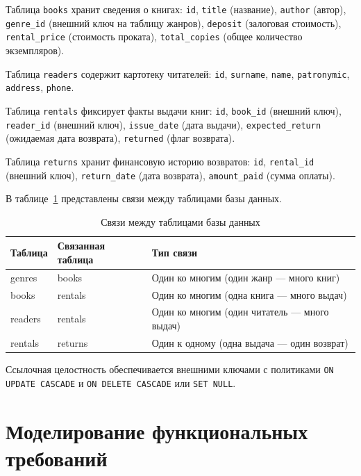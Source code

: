 \documentclass[14pt]{extreport}
\begin{document}
	Таблица \texttt{books} хранит сведения о книгах: \texttt{id}, \texttt{title} (название), \texttt{author} (автор), \texttt{genre\_id} (внешний ключ на таблицу жанров), \texttt{deposit} (залоговая стоимость), \texttt{rental\_price} (стоимость проката), \texttt{total\_copies} (общее количество экземпляров).
	
	Таблица \texttt{readers} содержит картотеку читателей: \texttt{id}, \texttt{surname}, \texttt{name}, \texttt{patronymic}, \texttt{address}, \texttt{phone}.
	
	Таблица \texttt{rentals} фиксирует факты выдачи книг: \texttt{id}, \texttt{book\_id} (внешний ключ), \texttt{reader\_id} (внешний ключ), \texttt{issue\_date} (дата выдачи), \texttt{expected\_return} (ожидаемая дата возврата), \texttt{returned} (флаг возврата).
	
	Таблица \texttt{returns} хранит финансовую историю возвратов: \texttt{id}, \texttt{rental\_id} (внешний ключ), \texttt{return\_date} (дата возврата), \texttt{amount\_paid} (сумма оплаты).
	
	В таблице~\ref{tab:relations} представлены связи между таблицами базы данных.
	
	\begin{table}[H]
		\caption{Связи между таблицами базы данных}
		\label{tab:relations}
		\begin{tabular}{|p{4cm}|p{4cm}|p{5cm}|}
			\hline
			\textbf{Таблица} & \textbf{Связанная \newline таблица} & \textbf{Тип связи} \\
			\hline
			genres & books & Один ко многим (один жанр --- много книг) \\
			\hline
			books & rentals & Один ко многим (одна книга --- много выдач) \\
			\hline
			readers & rentals & Один ко многим (один читатель --- много выдач) \\
			\hline
			rentals & returns & Один к одному (одна выдача --- один возврат) \\
			\hline
		\end{tabular}
	\end{table}
	
	Ссылочная целостность обеспечивается внешними ключами с политиками \texttt{ON UPDATE CASCADE} и \texttt{ON DELETE CASCADE} или \texttt{SET NULL}.
	
	
	\chapter{Моделирование функциональных требований}
	
\end{document}
